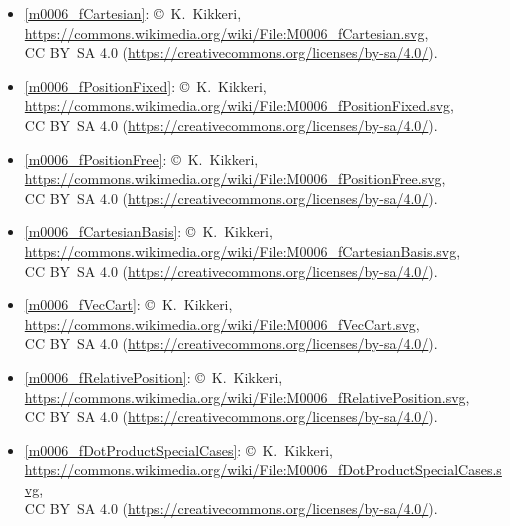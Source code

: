 \begin{itemize}

\item[Fig.] \label{m0006_fCartesian_Credit}
  \ref{m0006_fCartesian}:
  \copyright~K.\ Kikkeri, 
  \url{https://commons.wikimedia.org/wiki/File:M0006_fCartesian.svg},\\ 
  CC BY~SA 4.0 (\url{https://creativecommons.org/licenses/by-sa/4.0/}).

\item[Fig.] \label{m0006_fPositionFixed_Credit}
  \ref{m0006_fPositionFixed}:
  \copyright~K.\ Kikkeri, 
  \url{https://commons.wikimedia.org/wiki/File:M0006_fPositionFixed.svg},\\ 
  CC BY~SA 4.0 (\url{https://creativecommons.org/licenses/by-sa/4.0/}).

\item[Fig.] \label{m0006_fPositionFree_Credit}
  \ref{m0006_fPositionFree}:
  \copyright~K.\ Kikkeri, 
  \url{https://commons.wikimedia.org/wiki/File:M0006_fPositionFree.svg},\\ 
  CC BY~SA 4.0 (\url{https://creativecommons.org/licenses/by-sa/4.0/}).

\item[Fig.] \label{m0006_fCartesianBasis_Credit}
  \ref{m0006_fCartesianBasis}:
  \copyright~K.\ Kikkeri, 
  \url{https://commons.wikimedia.org/wiki/File:M0006_fCartesianBasis.svg},\\ 
  CC BY~SA 4.0 (\url{https://creativecommons.org/licenses/by-sa/4.0/}).

\item[Fig.] \label{m0006_fVecCart_Credit}
  \ref{m0006_fVecCart}:
  \copyright~K.\ Kikkeri, 
  \url{https://commons.wikimedia.org/wiki/File:M0006_fVecCart.svg},\\ 
  CC BY~SA 4.0 (\url{https://creativecommons.org/licenses/by-sa/4.0/}).

\item[Fig.] \label{m0006_fRelativePosition_Credit}
  \ref{m0006_fRelativePosition}:
  \copyright~K.\ Kikkeri, 
  \url{https://commons.wikimedia.org/wiki/File:M0006_fRelativePosition.svg},\\ 
  CC BY~SA 4.0 (\url{https://creativecommons.org/licenses/by-sa/4.0/}).

\item[Fig.] \label{m0006_fDotProductSpecialCases_Credit}
  \ref{m0006_fDotProductSpecialCases}:
  \copyright~K.\ Kikkeri, 
  \url{https://commons.wikimedia.org/wiki/File:M0006_fDotProductSpecialCases.svg},\\ 
  CC BY~SA 4.0 (\url{https://creativecommons.org/licenses/by-sa/4.0/}).


\end{itemize}
